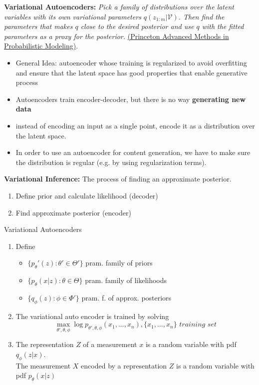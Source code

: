 \textbf{Variational Autoencoders: }
\textit{Pick a family of distributions over the latent variables with its own variational parameters $q(z_{1:m}| \mathcal V)$. Then find the parameters that makes $q$ close to the desired posterior and use $q$ with the fitted parameters as a proxy for the posterior.} \href{https://www.cs.princeton.edu/courses/archive/fall11/cos597C/lectures/variational-inference-i.pdf}{(Princeton Advanced Methods in Probabilistic Modeling)}.

\begin{itemize}
	\item General Idea: autoencoder whose training is regularized to avoid overfitting and ensure that the latent space has good properties that enable generative process
	\item Autoencoders train encoder-decoder, but there is no way \textbf{generating new data}
	\item instead of encoding an input as a single point, encode it as a distribution over the latent space.
	\item In order to use an autoencoder for content generation, we have to make sure the distribution is regular (e.g. by using regularization terms).
\end{itemize}

\textbf{Variational Inference: } The process of finding an approximate posterior.
\begin{enumerate}
	\item Define prior and calculate likelihood (decoder)
	\item Find approximate posterior (encoder)
\end{enumerate}

\begin{highlight}{Variational Autoencoders}
\begin{enumerate}
	\item Define 
	\begin{itemize}
		\item $\{p_\theta'(z): \theta'\in \Theta'\}$ pram. family of priors
		\item $\{p_\theta(x|z): \theta\in \Theta\}$ pram. family of likelihoods
		\item $\{q_\phi(z): \phi\in \Phi'\}$ pram. f. of approx. posteriors
	\end{itemize}
	\item The variational auto encoder is trained by solving 
	$$
		\max_{\theta', \theta, \phi}\log p_{\theta', \theta, \phi}(x_1, ..., x_n), \{x_1, ..., x_n\} \textit{ training set}
	$$
	\item The representation $Z$ of a measurement $x$ is a random variable with pdf $q_\phi(z|x)$.\\ The measurement $X$ encoded by a representation $Z$ is a random variable with pdf $p_\theta(x|z)$
\end{enumerate}
\end{highlight}


